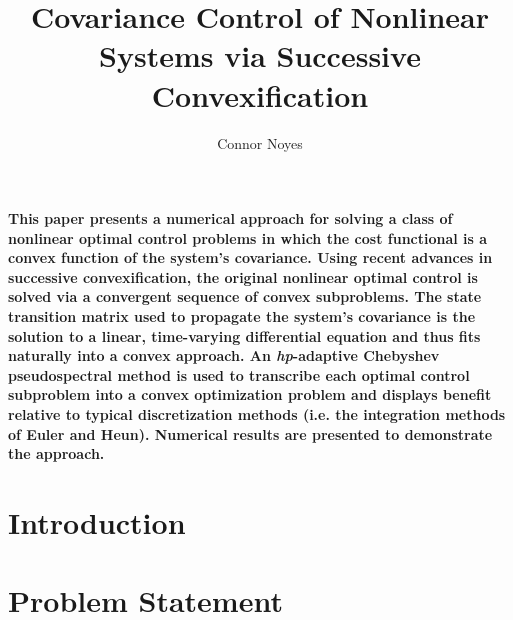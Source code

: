 \documentclass[10pt,a4paper]{article}
\author{Connor Noyes}
\title{Covariance Control of Nonlinear Systems via Successive Convexification}
\begin{document}
	\maketitle




	\section*{}
	\textbf{This paper presents a numerical approach for solving a class of nonlinear optimal control problems in which the cost functional is a convex function of the system's covariance. Using recent advances in successive convexification, the original nonlinear optimal control is solved via a convergent sequence of convex subproblems. The state transition matrix used to propagate the system's covariance is the solution to a linear, time-varying differential equation and thus fits naturally into a convex approach. An \textit{hp}-adaptive Chebyshev pseudospectral method is used to transcribe each optimal control subproblem into a convex optimization problem and displays benefit relative to typical discretization methods (i.e. the integration methods of Euler and Heun). Numerical results are presented to demonstrate the approach.}
	
	\section{Introduction}


		
	
		
	\section{Problem Statement}
	
\end{document}

